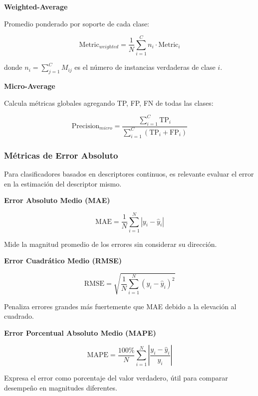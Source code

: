 \textbf{Weighted-Average}

Promedio ponderado por soporte de cada clase:

\begin{equation}
\text{Metric}_{weighted} = \frac{1}{N}\sum_{i=1}^{C} n_i \cdot \text{Metric}_i
\end{equation}

donde $n_i = \sum_{j=1}^{C} M_{ij}$ es el número de instancias verdaderas de clase $i$.

\textbf{Micro-Average}

Calcula métricas globales agregando TP, FP, FN de todas las clases:

\begin{equation}
\text{Precision}_{micro} = \frac{\sum_{i=1}^{C} \text{TP}_i}{\sum_{i=1}^{C} (\text{TP}_i + \text{FP}_i)}
\end{equation}

\subsubsection{Métricas de Error Absoluto}

Para clasificadores basados en descriptores continuos, es relevante evaluar el error en la estimación del descriptor mismo.

\textbf{Error Absoluto Medio (MAE)}

\begin{equation}
\text{MAE} = \frac{1}{N}\sum_{i=1}^{N}|y_i - \hat{y}_i|
\end{equation}

Mide la magnitud promedio de los errores sin considerar su dirección.

\textbf{Error Cuadrático Medio (RMSE)}

\begin{equation}
\text{RMSE} = \sqrt{\frac{1}{N}\sum_{i=1}^{N}(y_i - \hat{y}_i)^2}
\end{equation}

Penaliza errores grandes más fuertemente que MAE debido a la elevación al cuadrado.

\textbf{Error Porcentual Absoluto Medio (MAPE)}

\begin{equation}
\text{MAPE} = \frac{100\%}{N}\sum_{i=1}^{N}\left|\frac{y_i - \hat{y}_i}{y_i}\right|
\end{equation}

Expresa el error como porcentaje del valor verdadero, útil para comparar desempeño en magnitudes diferentes.

